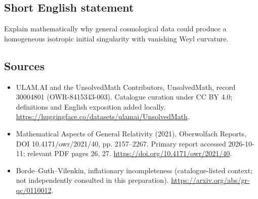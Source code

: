 \documentclass[11pt]{article}
\begin{document}
\subsection{Short English statement}
Explain mathematically why general cosmological data could produce a homogeneous isotropic initial singularity with vanishing Weyl curvature.
\subsection{Sources}
\begin{itemize}
\item[\hypertarget{source:30004801:1}{S1}] ULAM.AI and the UnsolvedMath Contributors, UnsolvedMath, record 30004801 (OWR-8415343-003). Catalogue curation under CC BY 4.0; definitions and English exposition added locally.
\url{https://huggingface.co/datasets/ulamai/UnsolvedMath}.
\item[\hypertarget{source:30004801:2}{S2}] Mathematical Aspects of General Relativity (2021), Oberwolfach Reports, DOI 10.4171/owr/2021/40, pp. 2157--2267. Primary report accessed 2026-10-11; relevant PDF pages 26, 27.
\url{https://doi.org/10.4171/owr/2021/40}.
\item[\hypertarget{source:30004801:3}{S3}] Borde--Guth--Vilenkin, inflationary incompleteness (catalogue-listed context; not independently consulted in this preparation).
\url{https://arxiv.org/abs/gr-qc/0110012}.
\end{itemize}
\label{end:30004801}
\end{document}
